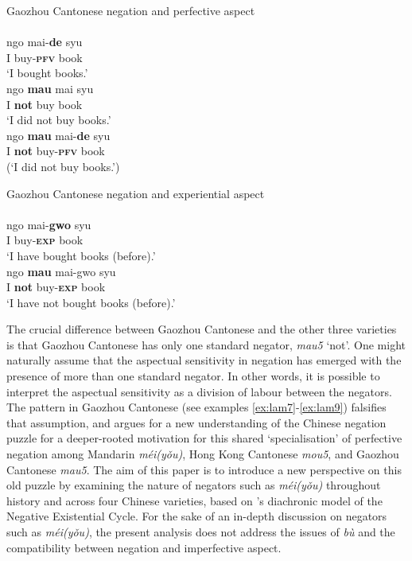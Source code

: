 \documentclass[output=paper]{langscibook}
\begin{document}
\ea Gaozhou Cantonese negation and perfective aspect \label{ex:lam8}\\
   \label{ex:lam8a}\\
  	\gll ngo mai-\textbf{de} syu\\
  	I buy-\textbf{\textsc{pfv}} book\\
 	 \glt `I bought books.'	
   \label{ex:lam8b}\\
  	\gll ngo \textbf{mau} mai syu\\
  	I \textbf{not} buy book\\
  	\glt `I did not buy books.'
   \label{ex:lam8c}\\
	\gll *ngo \textbf{mau} mai-\textbf{de} syu\\
	I \textbf{not} buy-\textbf{\textsc{pfv}} book\\
	\glt (`I did not buy books.')
\z \z 


\ea Gaozhou Cantonese negation and experiential aspect \label{ex:lam9}\\
   \label{ex:lam9a}\\
  	\gll ngo mai-\textbf{gwo} syu \\
  	I buy-\textbf{\textsc{exp}} book\\
  	\glt `I have bought books (before).'
   \label{ex:lam9b}\\
  	\gll ngo	 \textbf{mau} mai-gwo syu \\
  	I \textbf{not} buy-\textbf{\textsc{exp}} book\\
  	\glt `I have not bought books (before).'
\z \z 


The crucial difference between Gaozhou Cantonese and the other three varieties is that Gaozhou Cantonese has only one standard negator, \textit{mau5} `not'. One might naturally assume that the aspectual sensitivity in negation has emerged with the presence of more than one standard negator. In other words, it is possible to interpret the aspectual sensitivity as a division of labour between the negators. The pattern in Gaozhou Cantonese (see examples \ref{ex:lam7}-\ref{ex:lam9}) falsifies that assumption, and argues for a new understanding of the Chinese negation puzzle for a deeper-rooted motivation for this shared `specialisation' of perfective negation among Mandarin \textit{méi(yǒu)}, Hong Kong Cantonese \textit{mou5}, and Gaozhou Cantonese \textit{mau5}. The aim of this paper is to introduce a new perspective on this old puzzle by examining the nature of negators such as \textit{méi(yǒu)} throughout history and across four Chinese varieties, based on \citeauthor{Croft1991}'s diachronic model of the Negative Existential Cycle. For the sake of an in-depth discussion on negators such as \textit{méi(yǒu)}, the present analysis does not address the issues of \textit{bù} and the compatibility between negation and imperfective aspect.
\end{document}
